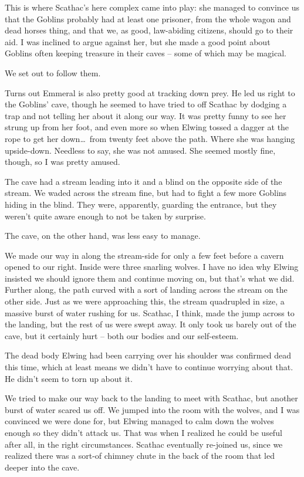 This is where Scathac's here complex came into play: she managed to convince us that the Goblins probably had at least one prisoner, from the whole wagon and dead horses thing, and that we, as good, law-abiding citizens, should go to their aid. I was inclined to argue against her, but she made a good point about Goblins often keeping treasure in their caves -- some of which may be magical.

We set out to follow them.

Turns out Emmeral is also pretty good at tracking down prey. He led us right to the Goblins' cave, though he seemed to have tried to off Scathac by dodging a trap and not telling her about it along our way. It was pretty funny to see her strung up from her foot, and even more so when Elwing tossed a dagger at the rope to get her down\dots\ from twenty feet above the path. Where she was hanging upside-down. Needless to say, she was not amused. She seemed mostly fine, though, so I was pretty amused.

The cave had a stream leading into it and a blind on the opposite side of the stream. We waded across the stream fine, but had to fight a few more Goblins hiding in the blind. They were, apparently, guarding the entrance, but they weren't quite aware enough to not be taken by surprise.

The cave, on the other hand, was less easy to manage.

We made our way in along the stream-side for only a few feet before a cavern opened to our right. Inside were three snarling wolves. I have no idea why Elwing insisted we should ignore them and continue moving on, but that's what we did. Further along, the path curved with a sort of landing across the stream on the other side. Just as we were approaching this, the stream quadrupled in size, a massive burst of water rushing for us. Scathac, I think, made the jump across to the landing, but the rest of us were swept away. It only took us barely out of the cave, but it certainly hurt -- both our bodies and our self-esteem.

The dead body Elwing had been carrying over his shoulder was confirmed dead this time, which at least means we didn't have to continue worrying about that. He didn't seem to torn up about it.

We tried to make our way back to the landing to meet with Scathac, but another burst of water scared us off. We jumped into the room with the wolves, and I was convinced we were done for, but Elwing managed to calm down the wolves enough so they didn't attack us. That was when I realized he could be useful after all, in the right circumstances. Scathac eventually re-joined us, since we realized there was a sort-of chimney chute in the back of the room that led deeper into the cave.

